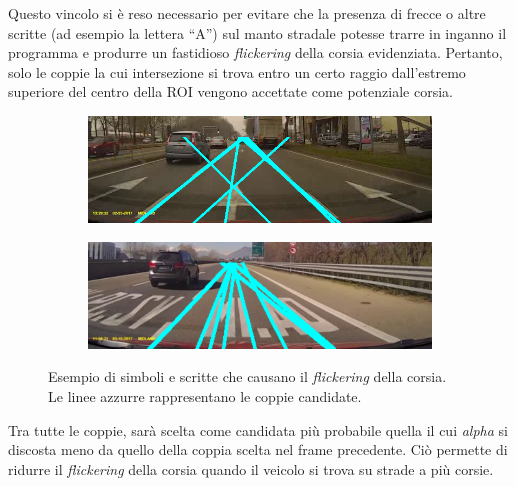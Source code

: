 \documentclass[12pt]{article}
\begin{document}
\begin{itemize}
Questo vincolo si è reso necessario per evitare che la presenza di frecce o altre scritte (ad esempio la lettera ``A'') sul manto stradale potesse trarre in inganno il programma e produrre un fastidioso \textit{flickering} della corsia evidenziata. Pertanto, solo le coppie la cui intersezione si trova entro un certo raggio dall'estremo superiore del centro della ROI vengono accettate come potenziale corsia.
\begin{figure}[htbp]
\centering
    \begin{subfigure}[b]{0.4\textwidth}
        \includegraphics[width=\textwidth]{freccia.png}
    \end{subfigure}
    \begin{subfigure}[b]{0.4\textwidth}
        \includegraphics[width=\textwidth]{scritte.png}
    \end{subfigure}
\caption{Esempio di simboli e scritte che causano il \textit{flickering} della corsia.\\
Le linee azzurre rappresentano le coppie candidate.}
\end{figure}
\end{itemize}
Tra tutte le coppie, sarà scelta come candidata più probabile quella il cui \textit{alpha} si discosta meno da quello della coppia scelta nel frame precedente. Ciò permette di ridurre il \textit{flickering} della corsia quando il veicolo si trova su strade a più corsie.
\end{document}
